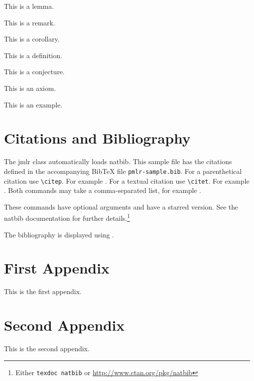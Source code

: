\documentclass[mlabstract]{jmlr}
\begin{document}
\begin{lemma}\label{lem:sample}
This is a lemma.
\end{lemma}

\begin{remark}\label{rem:sample}
This is a remark.
\end{remark}

\begin{corollary}\label{cor:sample}
This is a corollary.
\end{corollary}

\begin{definition}\label{def:sample}
This is a definition.
\end{definition}

\begin{conjecture}\label{con:sample}
This is a conjecture.
\end{conjecture}

\begin{axiom}\label{ax:sample}
This is an axiom.
\end{axiom}

\begin{example}[An Example]\label{ex:sample}
This is an example.
\end{example}

\section{Citations and Bibliography}
\label{sec:cite}

The \textsf{jmlr} class automatically loads \textsf{natbib}.
This sample file has the citations defined in the accompanying
BibTeX file \texttt{pmlr-sample.bib}. For a parenthetical
citation use \verb|\citep|. For example
\citep{guyon-elisseeff-03}. For a textual citation use
\verb|\citet|. For example \citet{guyon2007causalreport}.
Both commands may take a comma-separated list, for example
\citet{guyon-elisseeff-03,guyon2007causalreport}.

These commands have optional arguments and have a starred
version. See the \textsf{natbib} documentation for further
details.\footnote{Either \texttt{texdoc natbib} or
\url{http://www.ctan.org/pkg/natbib}}

The bibliography is displayed using \verb||.




\appendix

\section{First Appendix}\label{apd:first}

This is the first appendix.

\section{Second Appendix}\label{apd:second}

This is the second appendix.
\end{document}
